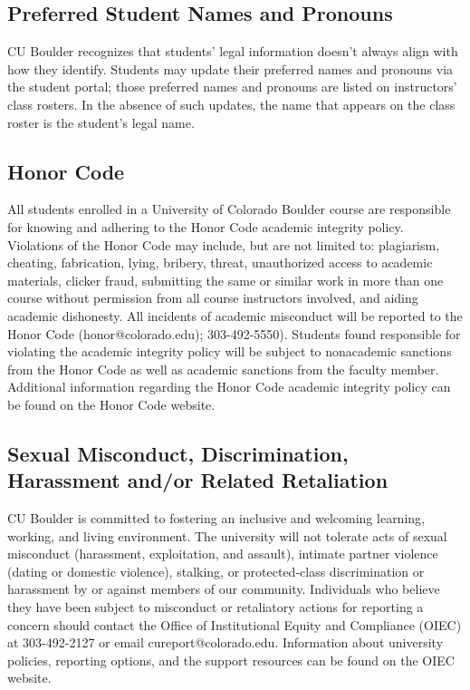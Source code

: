 \documentclass[11pt, a4paper]{article}
\begin{document}
\subsection*{Preferred Student Names and Pronouns}

CU Boulder recognizes that students' legal information doesn't always align with how they identify. Students may update their preferred names and pronouns via the student portal; those preferred names and pronouns are listed on instructors' class rosters. In the absence of such updates, the name that appears on the class roster is the student's legal name.

\subsection*{Honor Code}

All students enrolled in a University of Colorado Boulder course are responsible for knowing and adhering to the Honor Code academic integrity policy. Violations of the Honor Code may include, but are not limited to: plagiarism, cheating, fabrication, lying, bribery, threat, unauthorized access to academic materials, clicker fraud, submitting the same or similar work in more than one course without permission from all course instructors involved, and aiding academic dishonesty. All incidents of academic misconduct will be reported to the Honor Code (honor@colorado.edu); 303-492-5550). Students found responsible for violating the academic integrity policy will be subject to nonacademic sanctions from the Honor Code as well as academic sanctions from the faculty member. Additional information regarding the Honor Code academic integrity policy can be found on the Honor Code website.

\subsection*{Sexual Misconduct, Discrimination, Harassment and/or Related Retaliation}

CU Boulder is committed to fostering an inclusive and welcoming learning, working, and living environment. The university will not tolerate acts of sexual misconduct (harassment, exploitation, and assault), intimate partner violence (dating or domestic violence), stalking, or protected-class discrimination or harassment by or against members of our community. Individuals who believe they have been subject to misconduct or retaliatory actions for reporting a concern should contact the Office of Institutional Equity and Compliance (OIEC) at 303-492-2127 or email cureport@colorado.edu. Information about university policies, reporting options, and the support resources can be found on the OIEC website.
\end{document}
